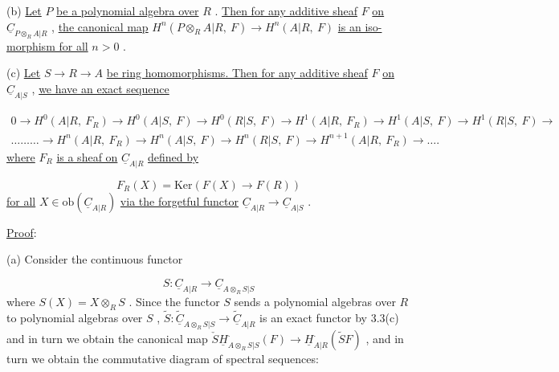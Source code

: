 (b)  \underline{Let}  $P$  \underline{be a polynomial algebra over}  $R$  . \underline{Then for any additive sheaf}  $F$  \underline{on}  $\underline{C}_{P\otimes_R A|R}$  , \underline{the canonical map}  $H^n(P\otimes_R A|R,\ F) \to H^n(A|R,\ F)$  \underline{is an iso-morphism for all}  $n > 0$  .

(c)  \underline{Let}  $S \to R \to A$  \underline{be ring homomorphisms. Then for any additive sheaf}  $F$  \underline{on}  $\underline{C}_{A|S}$  , \underline{we have an exact sequence}

{\small \begin{multline*}
0 \to H^0(A|R,\ F_R) \to H^0(A|S,\ F) \to H^0(R|S,\ F) \to H^1(A|R,\ F_R) \to H^1(A|S,\ F) \to H^1(R|S,\ F) \to \\ \ldots\ldots\ldots \to H^n(A|R,\ F_R) \to H^n(A|S,\ F) \to H^n(R|S,\ F) \to H^{n+1}(A|R,\ F_R) \to \ldots.
\end{multline*}}
\underline{where}  $F_R$  \underline{is a sheaf on}  $\underline{C}_{A|R}$ \underline{defined by}

\begin{equation*}
F_R(X) = \mathrm{Ker}(F(X) \to F(R))
\end{equation*}
\underline{for all}  $X \in \mathrm{ob}(\underline{C}_{A|R})$  \underline{via the forgetful functor}  $\underline{C}_{A|R} \to \underline{C}_{A|S}$  .


\underline{Proof}:

(a)  Consider the continuous functor

\begin{equation*}
S : \underline{C}_{A|R} \to \underline{C}_{A\otimes_R S|S}
\end{equation*}
where  $S(X) = X\otimes_R S$  . Since the functor  $S$  sends a polynomial algebras over  $R$  to polynomial algebras over  $S$  ,  $\widetilde{S} : \widetilde{\underline{C}}_{A\otimes_R S|S} \to \widetilde{\underline{C}}_{A|R}$  is an exact functor by 3.3(c) and in turn we obtain the canonical map  $\check{S}\underline{H}^{\cdot}_{A\otimes_R S|S}(F) \to \underline{H}^{\cdot}_{A|R}(\widetilde{S}F)$  , and in turn we obtain the commutative diagram of spectral sequences:

